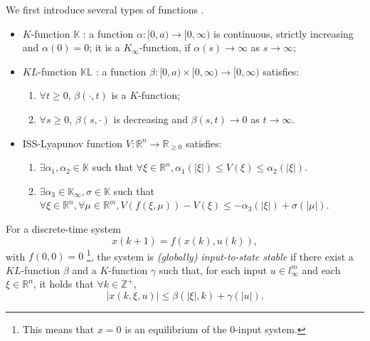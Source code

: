 We first introduce several types of functions \cite{Jiang2001857}.
\begin{itemize}
\item $ K $-function $ \mathbb{K} $ : a function $ \alpha  : [ 0, a ) \rightarrow [ 0, \infty ) $ is continuous, strictly increasing and $ \alpha (0) = 0 $; it is a $ K_{\infty} $-function, if $ \alpha (s) \rightarrow \infty $ as $ s \rightarrow \infty $;
\item $ KL $-function $ \mathbb{KL} $ : a function $ \beta : [ 0, a ) \times [ 0 , \infty ) \rightarrow [ 0, \infty ) $ satisfies:
\begin{enumerate}
\item $ \forall t \geq 0 $, $ \beta (\cdot , t ) $ is a $ K $-function;
\item $ \forall s \geq 0 $, $ \beta (s, \cdot) $ is decreasing and $ \beta(s,t) \rightarrow 0 $ as $ t \rightarrow \infty $.
\end{enumerate}
\item ISS-Lyapunov function $ V : \mathbb{R}^{n} \rightarrow \mathbb{R}_{\geq 0} $ satisfies:
\begin{enumerate}
\item $ \exists \alpha_{1}, \alpha_{2} \in \mathbb{K} $ such that 
$ \forall \xi \in \mathbb{R}^{n}, \alpha_{1} ( | \xi | ) \leq V( \xi ) \leq \alpha_{2}  ( | \xi | ) $.
\item $ \exists \alpha_{3} \in \mathbb{K}_{\infty} , \sigma \in \mathbb{K} $ such that $ \forall \xi \in \mathbb{R}^{n}, \forall \mu \in \mathbb{R}^{m}, V( f( \xi, \mu ) ) - V( \xi ) \leq - \alpha_{3} ( | \xi | ) + \sigma ( | \mu | ) $. 
\end{enumerate}
\end{itemize}

\begin{mydef}\cite{Jiang2001857}
\label{def:iss}
For a discrete-time system
\begin{equation}
\label{eq:dis_nonlinear}
x(k+1) = f( x(k) , u(k) ),
\end{equation}
with $ f(0,0) = 0 $
\footnote{This means that $ x = 0 $ is an equilibrium of the 0-input system.}, the system is \emph{(globally) input-to-state stable} if there exist a $ KL $-function $ \beta  $ and a $ K $-function $ \gamma $ such that, for each input $ u \in l^{m}_{\infty} $ and each $ \xi \in \mathbb{R}^{n} $, it holds that $  \forall k \in \mathbb{Z}^{+} $,
\begin{equation}
\label{eq:def_iss}
| x(k, \xi, u) | \leq \beta (| \xi |, k) + \gamma ( | u | ).
\end{equation}
\end{mydef}

